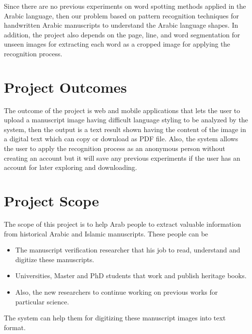 \noindent
Since there are no previous experiments on word spotting methods applied in the Arabic language, then our problem based on pattern recognition techniques for handwritten Arabic manuscripts to understand the Arabic language shapes. In addition, the project also depends on the page, line, and word segmentation for unseen images for extracting each word as a cropped image for applying the recognition process.

\section{Project Outcomes}
The outcome of the project is web and mobile applications that lets the user to upload a manuscript image having difficult language styling to be analyzed by the system, then the output is a text result shown having the content of the image in a digital text which can copy or download as PDF file. Also, the system allows the user to apply the recognition process as an anonymous person without creating an account but it will save any previous experiments if the user has an account for later exploring and downloading.

\clearpage

\section{Project Scope}
The scope of this project is to help Arab people to extract valuable information from historical Arabic and Islamic manuscripts. These people can be

\begin{itemize}[itemsep=1pt, topsep=5pt]
    \item The manuscript verification researcher that his job to read, understand and digitize these manuscripts.
    \item Universities, Master and PhD students that work and publish heritage books.
    \item Also, the new researchers to continue working on previous works for particular science.
\end{itemize}

The system can help them for digitizing these manuscript images into text format.

